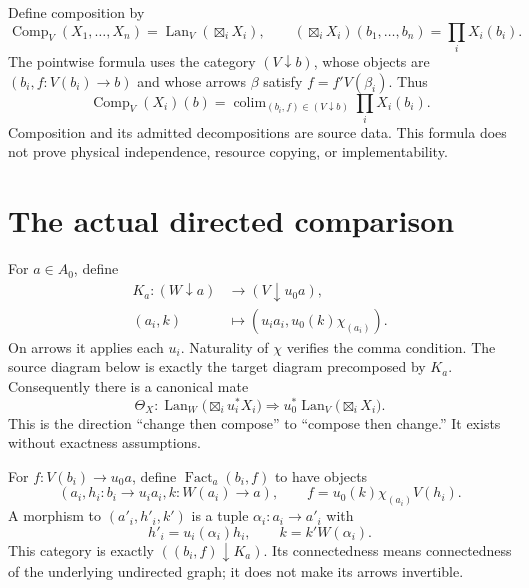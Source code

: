 \documentclass[11pt]{article}
\theoremstyle{definition}\newtheorem{definition}[theorem]{Definition}
\theoremstyle{remark}\newtheorem{remark}[theorem]{Remark}
\newcommand{\Lan}{\operatorname{Lan}}
\newcommand{\Fact}{\operatorname{Fact}}
\begin{document}
Define composition by
\[
 \operatorname{Comp}_V(X_1,\ldots,X_n)
   =\Lan_V(\mathop{\boxtimes}_i X_i),\qquad
 (\mathop{\boxtimes}_iX_i)(b_1,\ldots,b_n)=\prod_iX_i(b_i).
\]
The pointwise formula uses the category $(V\downarrow b)$, whose objects
are $(b_i,f:V(b_i)\to b)$ and whose arrows $\beta$ satisfy
$f=f'V(\beta_i)$. Thus
\[
 \operatorname{Comp}_V(X_i)(b)
   =\mathop{\operatorname{colim}}_{(b_i,f)\in(V\downarrow b)}
            \prod_iX_i(b_i).
\]
Composition and its admitted decompositions are source data. This formula
does not prove physical independence, resource copying, or implementability.

\section{The actual directed comparison}
For $a\in A_0$, define
\begin{align*}
 K_a:(W\downarrow a)&\longrightarrow(V\downarrow u_0a),\\
 (a_i,k)&\longmapsto
       (u_i a_i,u_0(k)\chi_{(a_i)}).
\end{align*}
On arrows it applies each $u_i$. Naturality of $\chi$ verifies the comma
condition. The source diagram below is exactly the target diagram
precomposed by $K_a$. Consequently there is a canonical mate
\begin{equation}\label{eq:mate}
 \Theta_X:\Lan_W\bigl(\mathop{\boxtimes}_i u_i^*X_i\bigr)
       \Longrightarrow u_0^*\Lan_V\bigl(\mathop{\boxtimes}_i X_i\bigr).
\end{equation}
This is the direction ``change then compose'' to ``compose then change.''
It exists without exactness assumptions.

For $f:V(b_i)\to u_0a$, define $\Fact_a(b_i,f)$ to have objects
\[
 (a_i,h_i:b_i\to u_i a_i,k:W(a_i)\to a),
 \qquad f=u_0(k)\chi_{(a_i)}V(h_i).
\]
A morphism to $(a'_i,h'_i,k')$ is a tuple $\alpha_i:a_i\to a'_i$ with
\[
 h'_i=u_i(\alpha_i)h_i,\qquad k=k'W(\alpha_i).
\]
This category is exactly $((b_i,f)\downarrow K_a)$. Its connectedness
means connectedness of the underlying undirected graph; it does not make
its arrows invertible.
\end{document}
